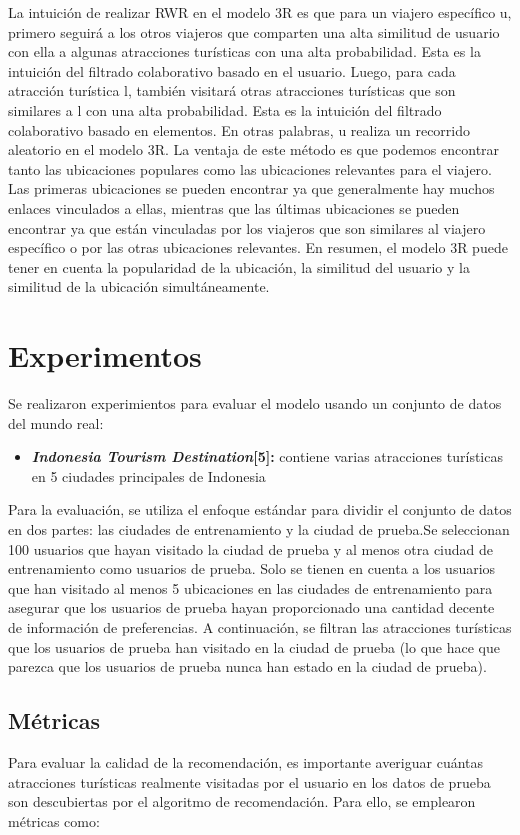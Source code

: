 \documentclass[runningheads]{llncs}
\begin{document}
La intuición de realizar RWR en el modelo 3R es que para un viajero específico u, primero seguirá a los otros viajeros que comparten una alta similitud de usuario con ella a algunas atracciones turísticas con una alta probabilidad. Esta es la intuición del filtrado colaborativo basado en el usuario. Luego, para cada atracción turística l, también visitará otras atracciones turísticas que son similares a l con una alta probabilidad. Esta es la intuición del filtrado colaborativo basado en elementos. En otras palabras, u realiza un recorrido aleatorio en el modelo 3R. La ventaja de este método es que podemos encontrar tanto las ubicaciones populares como las ubicaciones relevantes para el viajero. Las primeras ubicaciones se pueden encontrar ya que generalmente hay muchos enlaces vinculados a ellas, mientras que las últimas ubicaciones se pueden encontrar ya que están vinculadas por los viajeros que son similares al viajero específico o por las otras ubicaciones relevantes. En resumen, el modelo 3R puede tener en cuenta la popularidad de la ubicación, la similitud del usuario y la similitud de la ubicación simultáneamente.


\section{Experimentos}
Se realizaron experimientos para evaluar el modelo usando un conjunto de datos del mundo real:

\begin{itemize}
    \item \textbf{\textit{Indonesia Tourism Destination}[5]:}  contiene varias atracciones turísticas en 5 ciudades principales de Indonesia
\end{itemize}


Para la evaluación, se utiliza el enfoque estándar para dividir el conjunto de datos en dos partes: las ciudades de entrenamiento y la ciudad de prueba.Se seleccionan 100 usuarios que hayan visitado la ciudad de prueba y al menos otra ciudad de entrenamiento como usuarios de prueba. Solo se tienen en cuenta a los usuarios que han visitado al menos 5 ubicaciones en las ciudades de entrenamiento para asegurar que los usuarios de prueba hayan proporcionado una cantidad decente de información de preferencias. A continuación, se filtran las atracciones turísticas que los usuarios de prueba han visitado en la ciudad de prueba (lo que hace que parezca que los usuarios de prueba nunca han estado en la ciudad de prueba).

\subsection{Métricas}
Para evaluar la calidad de la recomendación, es importante averiguar cuántas atracciones turísticas realmente visitadas por el usuario en los datos de prueba son descubiertas por el algoritmo de recomendación. Para ello, se emplearon métricas como:
\end{document}
